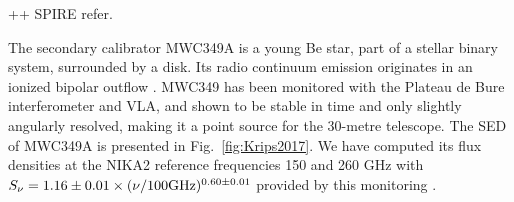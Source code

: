 


%

\label{se:fluxSec}

++ SPIRE refer.

The secondary calibrator MWC349A is a young Be star, part of a stellar binary system, surrounded by a disk. Its radio
continuum emission originates in an ionized bipolar outflow \cite{Tafoya}.
MWC349 has been monitored with the  Plateau de Bure interferometer and VLA,
and shown to be stable in time and only slightly angularly resolved, making it a point source
for the 30-metre telescope. The SED of MWC349A   \cite{krips} is presented in Fig.~\ref{fig:Krips2017}. We have computed its flux densities at the NIKA2 reference frequencies 150 and 260 GHz with 
$S_\nu = 1.16\pm0.01 \times (\nu/100 \rm{GHz})^{0.60\pm0.01}$ provided by this monitoring \cite{krips}.


